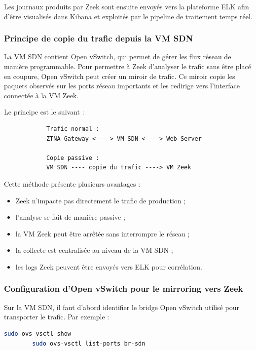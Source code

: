 \documentclass[12pt,a4paper,oneside]{report}
\begin{document}
	Les journaux produits par Zeek sont ensuite envoyés vers la plateforme ELK afin d'être visualisés dans Kibana et exploités par le pipeline de traitement temps réel.
	
	\subsubsection{Principe de copie du trafic depuis la VM SDN}
	
	La VM SDN contient Open vSwitch, qui permet de gérer les flux réseau de manière programmable. Pour permettre à Zeek d'analyser le trafic sans être placé en coupure, Open vSwitch peut créer un miroir de trafic. Ce miroir copie les paquets observés sur les ports réseau importants et les redirige vers l'interface connectée à la VM Zeek.
	
	Le principe est le suivant :
	
	\begin{center}
		\begin{verbatim}
			Trafic normal :
			ZTNA Gateway <----> VM SDN <----> Web Server
			
			Copie passive :
			VM SDN ---- copie du trafic ----> VM Zeek
		\end{verbatim}
	\end{center}
	
	Cette méthode présente plusieurs avantages :
	
	\begin{itemize}
		\item Zeek n'impacte pas directement le trafic de production ;
		\item l'analyse se fait de manière passive ;
		\item la VM Zeek peut être arrêtée sans interrompre le réseau ;
		\item la collecte est centralisée au niveau de la VM SDN ;
		\item les logs Zeek peuvent être envoyés vers ELK pour corrélation.
	\end{itemize}
	
	\subsubsection{Configuration d'Open vSwitch pour le mirroring vers Zeek}
	
	Sur la VM SDN, il faut d'abord identifier le bridge Open vSwitch utilisé pour transporter le trafic. Par exemple :
	
	\begin{lstlisting}[language=bash]
		sudo ovs-vsctl show
		sudo ovs-vsctl list-ports br-sdn
	\end{lstlisting}
	
\end{document}
